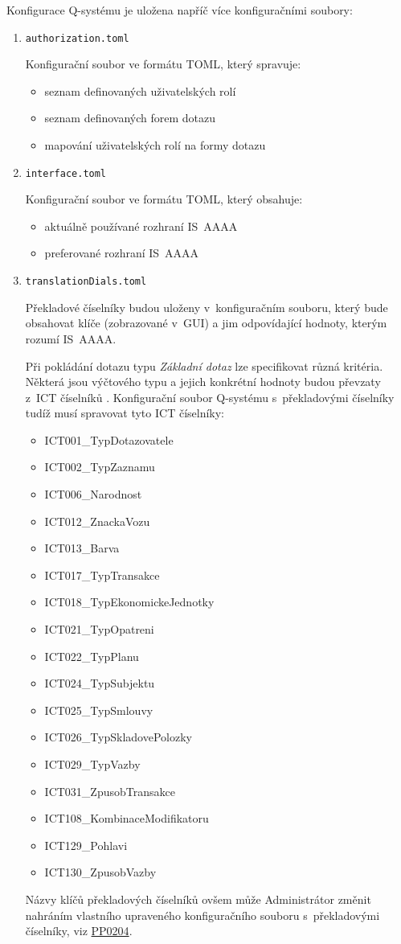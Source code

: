 \documentclass[thesis=M,czech]{FITthesis}[2019/12/23]
\begin{document}
\newpage
Konfigurace Q-systému je uložena napříč více konfiguračními soubory:
\begin{enumerate}
	\item \texttt{authorization.toml}
	
	Konfigurační soubor ve formátu TOML, který spravuje:
	\begin{itemize}
		\item seznam definovaných uživatelských rolí
		\item seznam definovaných forem dotazu
		\item mapování uživatelských rolí na formy dotazu
	\end{itemize}

	\item \texttt{interface.toml}
	
	Konfigurační soubor ve formátu TOML, který obsahuje:
	\begin{itemize}
		\item aktuálně používané rozhraní IS~AAAA
		\item preferované rozhraní IS~AAAA
	\end{itemize}

	\item \texttt{translationDials.toml}
	
	Překladové číselníky budou uloženy v~konfiguračním souboru, který bude obsahovat klíče (zobrazované v~GUI) a jim odpovídající hodnoty, kterým rozumí IS~AAAA.

	Při pokládání dotazu typu \textit{Základní dotaz} lze specifikovat různá kritéria. Některá jsou výčtového typu a jejich konkrétní hodnoty budou převzaty z~ICT číselníků \cite{ICT}. Konfigurační soubor Q-systému s~překladovými číselníky tudíž musí spravovat tyto ICT číselníky:
	\label{PrekladoveCiselniky}
	\begin{itemize}
	\item ICT001\_TypDotazovatele
	\item ICT002\_TypZaznamu
	\item ICT006\_Narodnost
	\item ICT012\_ZnackaVozu
	\item ICT013\_Barva
	\item ICT017\_TypTransakce
	\item ICT018\_TypEkonomickeJednotky
	\item ICT021\_TypOpatreni
	\item ICT022\_TypPlanu
	\item ICT024\_TypSubjektu
	\item ICT025\_TypSmlouvy
	\item ICT026\_TypSkladovePolozky
	\item ICT029\_TypVazby
	\item ICT031\_ZpusobTransakce
	\item ICT108\_KombinaceModifikatoru
	\item ICT129\_Pohlavi
	\item ICT130\_ZpusobVazby
	\end{itemize}
	Názvy klíčů překladových číselníků ovšem může Administrátor změnit nahráním vlastního upraveného konfiguračního souboru s~překladovými číselníky, viz \hyperref[PP0204]{PP0204}.
\end{enumerate}
\end{document}
